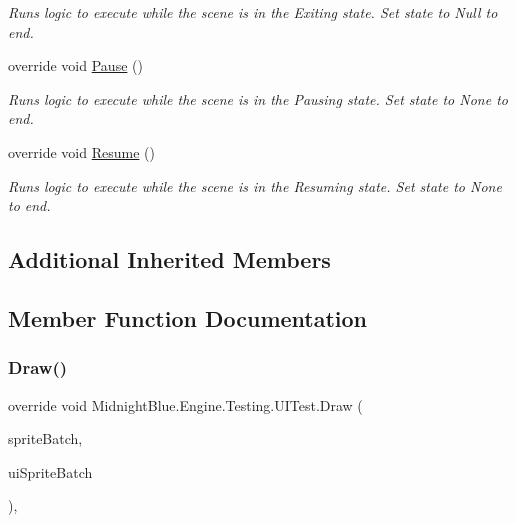 \begin{DoxyCompactItemize}
\begin{DoxyCompactList}\small\item\em Runs logic to execute while the scene is in the Exiting state. Set state to Null to end. \end{DoxyCompactList}\item 
override void \hyperlink{class_midnight_blue_1_1_engine_1_1_testing_1_1_u_i_test_ae7b12fd4ac0f143158c750c45e0775ce}{Pause} ()
\begin{DoxyCompactList}\small\item\em Runs logic to execute while the scene is in the Pausing state. Set state to None to end. \end{DoxyCompactList}\item 
override void \hyperlink{class_midnight_blue_1_1_engine_1_1_testing_1_1_u_i_test_a0c0ac7a8acf10482982ee63756605f61}{Resume} ()
\begin{DoxyCompactList}\small\item\em Runs logic to execute while the scene is in the Resuming state. Set state to None to end. \end{DoxyCompactList}\end{DoxyCompactItemize}
\subsection*{Additional Inherited Members}


\subsection{Member Function Documentation}
\hypertarget{class_midnight_blue_1_1_engine_1_1_testing_1_1_u_i_test_a8c8604e47a7ac4ef8b8c74e82ff5cb83}{}\label{class_midnight_blue_1_1_engine_1_1_testing_1_1_u_i_test_a8c8604e47a7ac4ef8b8c74e82ff5cb83} 
\subsubsection{\texorpdfstring{Draw()}{Draw()}}
{\footnotesize\ttfamily override void Midnight\+Blue.\+Engine.\+Testing.\+U\+I\+Test.\+Draw (\begin{DoxyParamCaption}\item[{Sprite\+Batch}]{sprite\+Batch,  }\item[{Sprite\+Batch}]{ui\+Sprite\+Batch }\end{DoxyParamCaption})\hspace{0.3cm}{\ttfamily [inline]}, {\ttfamily [virtual]}}



